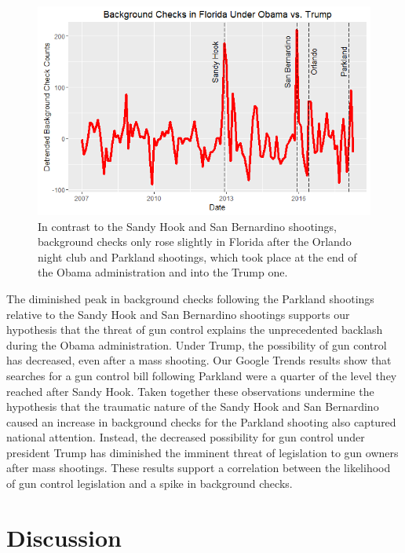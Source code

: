 \documentclass[9pt,twocolumn,twoside,lineno]{pnas-new}
\begin{document}
\begin{figure}
  \centering
  \includegraphics[width=\linewidth]{figures/florida}
  \caption{In contrast to the Sandy Hook and San Bernardino shootings, background checks only rose slightly in Florida after the Orlando night club and Parkland shootings, which took place at the end of the Obama administration and into the Trump one.}
  \label{fig:florida}
\end{figure}
The diminished peak in background checks following the Parkland shootings relative to the Sandy Hook and San Bernardino shootings supports our hypothesis that the threat of gun control explains the unprecedented backlash during the Obama administration. Under Trump, the possibility of gun control has decreased, even after a mass shooting. Our Google Trends results show that searches for a gun control bill following Parkland were a quarter of the level they reached after Sandy Hook. Taken together these observations undermine the hypothesis that the traumatic nature of the Sandy Hook and San Bernardino caused an increase in background checks for the Parkland shooting also captured national attention. Instead,  the decreased possibility for gun control under president Trump has diminished the imminent threat of legislation to gun owners after mass shootings. These results support a correlation between the likelihood of gun control legislation and a spike in background checks. 


\section*{Discussion}
\end{document}
